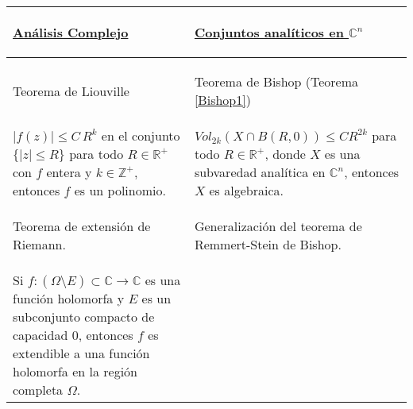 \documentclass[letterpaper]{report}
\newcommand{\zah}{\ensuremath{ \mathbb Z }}
\newcommand{\co}{\ensuremath{\mathbb C }}
\newcommand{\con}{\ensuremath{\mathbb{C}^n}}
\newcommand{\re}{\ensuremath{\mathbb R }}
\begin{document}
        \begin{tabular}{| m{5.5cm} | m{5.5cm} |} \hline
                        \begin{center} \vspace*{0.2cm} 
                                \underline{\textbf{An\'alisis Complejo}} 
                        \end{center} & 
                        \begin{center} \vspace*{0.2cm}
                                \underline{\textbf{Conjuntos anal\'iticos en $\con$}}
                        \end{center} \\
                \hline
                \begin{center} 
                        Teorema de Liouville 
                \end{center} & 
                \begin{center}
                        Teorema de Bishop (Teorema \ref{Bishop1})
                \end{center}\\ 
                        \hline $\vert f(z)\vert\leq C\,R^k$ en el conjunto $\{\vert z\vert\leq R\}$ 
                        para todo $R\in\re^{+}$con $f$ entera y $k\in\zah^{+}$, entonces 
                        $f$ es un polinomio. 
                        &
                        \vspace{0.1cm}
                        $Vol_{2k}(X\cap B(R,0))\leq CR^{2k}$ para todo
                        $R\in\re^{+}$, donde $X$ es una subvaredad anal\'itica en $\con$, entonces $X$ es algebraica.\\ 
                        \hline
                        \vspace{0.1cm}
                        \begin{center} 
                        Teorema de extensi\'on de Riemann. 
                \end{center} 
                        & 
                \begin{center} 
                        Generalizaci\'on del teorema de Remmert-Stein de Bishop. 
                \end{center} \\ 
                        \hline Si $f:(\Omega\setminus E)\subset\co\rightarrow\co$ es una funci\'on holomorfa y $E$ es un subconjunto
                        compacto de capacidad $0$, entonces $f$ es extendible a una funci\'on holomorfa
                        en la regi\'on completa $\Omega$.  
                        &


\end{tabular}
\end{document}
